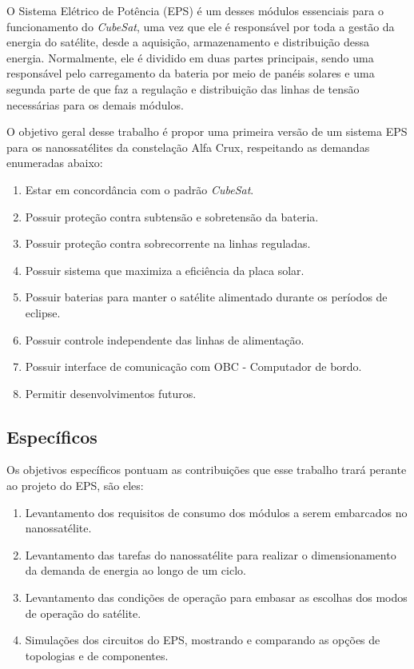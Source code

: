 O Sistema Elétrico de Potência (EPS) é um desses módulos essenciais para o funcionamento do \textit{CubeSat}, uma vez que ele é responsável por toda a gestão da energia do satélite, desde a aquisição, armazenamento e distribuição dessa energia. Normalmente, ele é dividido em duas partes principais, sendo uma responsável pelo carregamento da bateria por meio de panéis solares e uma segunda parte de que faz a regulação e distribuição das linhas de tensão necessárias para os demais módulos. 

O objetivo geral desse trabalho é propor uma primeira versão de um sistema EPS para os nanossatélites da constelação Alfa Crux, respeitando as demandas enumeradas abaixo:

\begin{enumerate}
    \item Estar em concordância com o padrão \textit{CubeSat}.
    \item Possuir proteção contra subtensão e sobretensão da bateria.
    \item Possuir proteção contra sobrecorrente na linhas reguladas.
    \item Possuir sistema que maximiza a eficiência da placa solar.
    \item Possuir baterias para manter o satélite alimentado durante os períodos de eclipse.
    \item Possuir controle independente das linhas de alimentação.
    \item Possuir interface de comunicação com OBC - Computador de bordo.
    \item Permitir desenvolvimentos futuros.
\end{enumerate}{}


\subsection*{Específicos}\label{especificos}
Os objetivos específicos pontuam as contribuições que esse trabalho trará perante ao projeto do EPS, são eles:
\begin{enumerate}
    \item Levantamento dos requisitos de consumo dos módulos a serem embarcados no nanossatélite.
    \item Levantamento das tarefas do nanossatélite para realizar o dimensionamento da demanda de energia ao longo de um ciclo.
    \item Levantamento das condições de operação para embasar as escolhas dos modos de operação do satélite.
    \item Simulações dos circuitos do EPS, mostrando e comparando as opções de topologias e de componentes.
\end{enumerate}